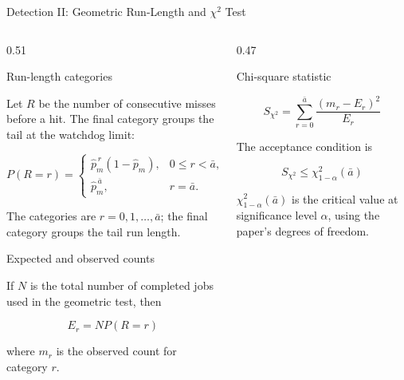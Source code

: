 \documentclass[9pt,aspectratio=169]{beamer}
\begin{document}
\begin{frame}{Detection II: Geometric Run-Length and $\chi^2$ Test}

\footnotesize

\begin{columns}[T,onlytextwidth]

\begin{column}{0.51\textwidth}

\begin{block}{Run-length categories}

Let $R$ be the number of consecutive misses before a hit.
The final category groups the tail at the watchdog limit:

\[
P(R=r)=
\begin{cases}
\hat p_m^{\,r}(1-\hat p_m),
    &0\leq r<\bar a,\\[1mm]
\hat p_m^{\,\bar a},
    &r=\bar a.
\end{cases}
\]

\scriptsize
The categories are $r=0,1,\ldots,\bar a$; the final
category groups the tail run length.

\end{block}

\begin{block}{Expected and observed counts}

If $N$ is the total number of completed jobs used in
the geometric test, then

\[
\boxed{
E_r=NP(R=r)
}
\]

where $m_r$ is the observed count for category $r$.

\end{block}

\end{column}


\begin{column}{0.47\textwidth}

\begin{block}{Chi-square statistic}

\[
\boxed{
S_{\chi^2}
=
\sum_{r=0}^{\bar a}
\frac{(m_r-E_r)^2}{E_r}
}
\]

The acceptance condition is

\[
\boxed{
S_{\chi^2}
\leq
\chi^2_{1-\alpha}(\bar a)
}
\]

\scriptsize
$\chi^2_{1-\alpha}(\bar a)$ is the critical value at
significance level $\alpha$, using the paper's
degrees of freedom.


\end{block}
\end{column}
\end{columns}
\end{frame}
\end{document}
